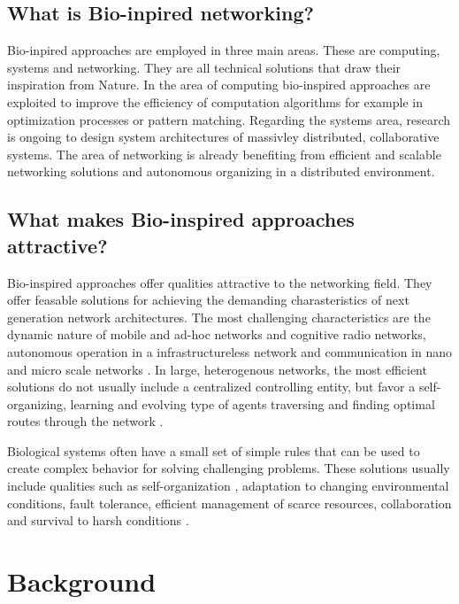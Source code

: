 \documentclass{IWORK2014}
\begin{document}
\subsection{What is Bio-inpired networking?}
Bio-inpired approaches are employed in three main areas. These are computing, systems and networking. They are all technical solutions that draw their inspiration from Nature. In the area of computing bio-inspired approaches are exploited to improve the efficiency of computation algorithms for example in optimization processes or pattern matching. Regarding the systems area, research is ongoing to design system architectures of massivley distributed, collaborative systems. The area of networking is already benefiting from efficient and scalable networking solutions and autonomous organizing in a distributed environment. \cite{dressler2010bio}

\subsection{What makes Bio-inspired approaches attractive?} 
Bio-inspired approaches offer qualities attractive to the networking field. They offer feasable solutions for achieving the demanding charasteristics of next generation network architectures. The most challenging characteristics are the dynamic nature of mobile and ad-hoc networks and cognitive radio networks, autonomous operation in a infrastructureless network and communication in nano and micro scale networks \cite{dressler2010bio}. In large, heterogenous networks, the most efficient solutions do not usually include a centralized controlling entity, but favor a self-organizing, learning and evolving type of agents traversing and finding optimal routes through the network \cite{dressler2010bio}.

Biological systems often have a small set of simple rules that can be used to create complex behavior \cite{dressler2010bio} for solving challenging problems. These solutions usually include qualities such as self-organization \cite{kroeker2011biology}, adaptation to changing environmental conditions, fault tolerance, efficient management of scarce resources, collaboration and survival to harsh conditions \cite{dressler2010bio}.

\section{Background}
\end{document}

